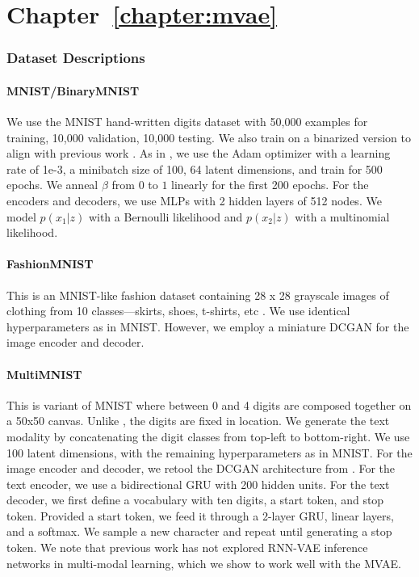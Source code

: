 \section{Chapter~\ref{chapter:mvae}}
\label{sec:app:mvae}
\subsubsection{Dataset Descriptions}

\paragraph{MNIST/BinaryMNIST}
We use the MNIST hand-written digits dataset \cite{lecun1998gradient} with 50,000 examples for training, 10,000 validation, 10,000 testing. We also train on a binarized version to align with previous work \cite{larochelle2011neural}.
As in \cite{suzuki2016joint}, we use the Adam optimizer \cite{kingma2014adam} with a learning rate of 1e-3, a minibatch size of 100, 64 latent dimensions, and train for 500 epochs. We anneal $\beta$ from $0$ to $1$ linearly for the first 200 epochs. For the encoders and decoders, we use MLPs with 2 hidden layers of 512 nodes. We model $p(x_{1}|z)$ with a Bernoulli likelihood and $p(x_{2}|z)$ with a multinomial likelihood.

\paragraph{FashionMNIST}
This is an MNIST-like fashion dataset containing 28 x 28 grayscale images of clothing from 10 classes---skirts, shoes, t-shirts, etc \cite{xiao2017fashion}. We use identical hyperparameters as in MNIST. However, we employ a miniature DCGAN \cite{radford2015unsupervised} for the image encoder and decoder.

\paragraph{MultiMNIST}
This is variant of MNIST where between 0 and 4 digits are composed together on a 50x50 canvas. Unlike \cite{eslami2016attend}, the digits are fixed in location. We generate the text modality by concatenating the digit classes from top-left to bottom-right.
We use 100 latent dimensions, with the remaining hyperparameters as in MNIST. For the image encoder and decoder, we retool the DCGAN architecture from \cite{radford2015unsupervised}. For the text encoder, we use a bidirectional GRU with 200 hidden units. For the text decoder, we first define a vocabulary with ten digits, a start token, and stop token. Provided a start token, we feed it through a 2-layer GRU,  linear layers, and a softmax. We sample a new character and repeat until generating a stop token. We note that previous work has not explored RNN-VAE inference networks in multi-modal learning, which we show to work well with the MVAE.

